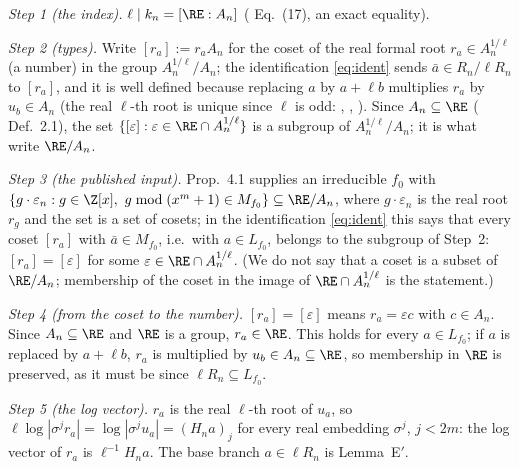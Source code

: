 \emph{Step 1 (the index).} $\ell\mid k_n=[\RE:A_n]$ (\cite{KY} Eq.~(17), an exact equality).

\emph{Step 2 (types).} Write $[r_a]:=r_aA_n$ for the coset of the real formal root $r_a\in A_n^{1/\ell}$ (a number) in the group $A_n^{1/\ell}/A_n$; the identification \eqref{eq:ident} sends $\bar a\in R_n/\ell R_n$ to $[r_a]$, and it is well defined because replacing $a$ by $a+\ell b$ multiplies $r_a$ by $u_b\in A_n$ (the real $\ell$-th root is unique since $\ell$ is odd: , , ). Since $A_n\subseteq\RE$ (\cite{KY} Def.~2.1), the set $\{[\varepsilon]:\varepsilon\in\RE\cap A_n^{1/\ell}\}$ is a subgroup of $A_n^{1/\ell}/A_n$; it is what \cite{KY} write $\RE/A_n$.

\emph{Step 3 (the published input).} \cite{KY} Prop.~4.1 supplies an irreducible $f_0$ with $\{g\cdot\varepsilon_n: g\in\Z[x],\ g\bmod(x^m+1)\in M_{f_0}\}\subseteq\RE/A_n$, where $g\cdot\varepsilon_n$ is the real root $r_g$ and the set is a set of cosets; in the identification \eqref{eq:ident} this says that every coset $[r_a]$ with $\bar a\in M_{f_0}$, i.e.\ with $a\in L_{f_0}$, belongs to the subgroup of Step~2: $[r_a]=[\varepsilon]$ for some $\varepsilon\in\RE\cap A_n^{1/\ell}$. (We do not say that a coset is a subset of $\RE/A_n$; membership of the coset in the image of $\RE\cap A_n^{1/\ell}$ is the statement.)

\emph{Step 4 (from the coset to the number).} $[r_a]=[\varepsilon]$ means $r_a=\varepsilon c$ with $c\in A_n$. Since $A_n\subseteq\RE$ and $\RE$ is a group, $r_a\in\RE$. This holds for every $a\in L_{f_0}$; if $a$ is replaced by $a+\ell b$, $r_a$ is multiplied by $u_b\in A_n\subseteq\RE$, so membership in $\RE$ is preserved, as it must be since $\ell R_n\subseteq L_{f_0}$.

\emph{Step 5 (the log vector).} $r_a$ is the real $\ell$-th root of $u_a$, so $\ell\log|\sigma^j r_a|=\log|\sigma^j u_a|=(H_na)_j$ for every real embedding $\sigma^j$, $j<2m$: the log vector of $r_a$ is $\ell^{-1}H_na$. The base branch $a\in\ell R_n$ is Lemma~E$'$.
